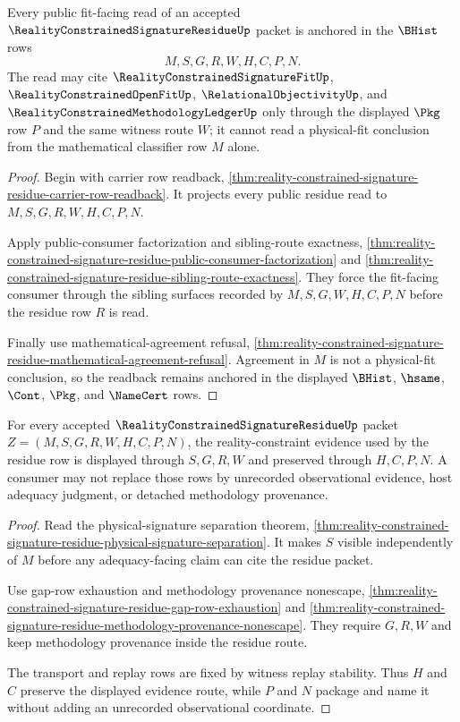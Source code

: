 \begin{theorem}
\label{thm:reality-constrained-signature-residue-fit-readback}
Every public fit-facing read of an accepted $\RealityConstrainedSignatureResidueUp$ packet is anchored in the $\BHist$ rows
$$
M,S,G,R,W,H,C,P,N.
$$
The read may cite $\RealityConstrainedSignatureFitUp$, $\RealityConstrainedOpenFitUp$, $\RelationalObjectivityUp$, and $\RealityConstrainedMethodologyLedgerUp$ only through the displayed $\Pkg$ row $P$ and the same witness route $W$; it cannot read a physical-fit conclusion from the mathematical classifier row $M$ alone.
\end{theorem}
\begin{proof}
Begin with carrier row readback, \autoref{thm:reality-constrained-signature-residue-carrier-row-readback}. It projects every public residue read to $M,S,G,R,W,H,C,P,N$.

Apply public-consumer factorization and sibling-route exactness, \autoref{thm:reality-constrained-signature-residue-public-consumer-factorization} and \autoref{thm:reality-constrained-signature-residue-sibling-route-exactness}. They force the fit-facing consumer through the sibling surfaces recorded by $M,S,G,W,H,C,P,N$ before the residue row $R$ is read.

Finally use mathematical-agreement refusal, \autoref{thm:reality-constrained-signature-residue-mathematical-agreement-refusal}. Agreement in $M$ is not a physical-fit conclusion, so the readback remains anchored in the displayed $\BHist$, $\hsame$, $\Cont$, $\Pkg$, and $\NameCert$ rows.
\end{proof}

\begin{theorem}
\label{thm:reality-constrained-signature-residue-constraint-evidence-display}
For every accepted $\RealityConstrainedSignatureResidueUp$ packet $Z=(M,S,G,R,W,H,C,P,N)$, the reality-constraint evidence used by the residue row is displayed through $S,G,R,W$ and preserved through $H,C,P,N$. A consumer may not replace those rows by unrecorded observational evidence, host adequacy judgment, or detached methodology provenance.
\end{theorem}
\begin{proof}
Read the physical-signature separation theorem, \autoref{thm:reality-constrained-signature-residue-physical-signature-separation}. It makes $S$ visible independently of $M$ before any adequacy-facing claim can cite the residue packet.

Use gap-row exhaustion and methodology provenance nonescape, \autoref{thm:reality-constrained-signature-residue-gap-row-exhaustion} and \autoref{thm:reality-constrained-signature-residue-methodology-provenance-nonescape}. They require $G,R,W$ and keep methodology provenance inside the residue route.

The transport and replay rows are fixed by witness replay stability. Thus $H$ and $C$ preserve the displayed evidence route, while $P$ and $N$ package and name it without adding an unrecorded observational coordinate.
\end{proof}

